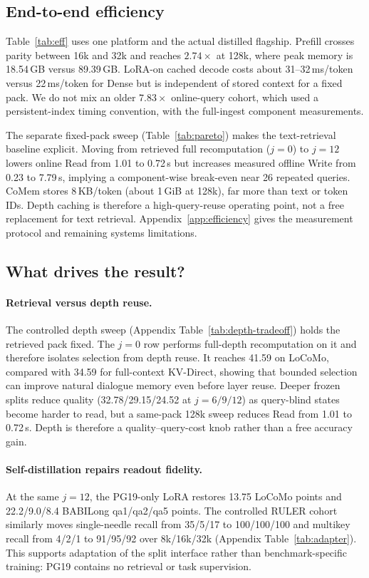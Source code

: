 \subsection{End-to-end efficiency}

Table~\ref{tab:eff} uses one platform and the actual distilled flagship. Prefill
crosses parity between 16k and 32k and reaches $2.74\times$ at 128k, where peak
memory is 18.54\,GB versus 89.39\,GB. LoRA-on cached decode costs about
31--32\,ms/token versus 22\,ms/token for Dense but is independent of stored
context for a fixed pack. We do not mix an older $7.83\times$ online-query
cohort, which used a persistent-index timing convention, with the full-ingest
component measurements.

The separate fixed-pack sweep (Table~\ref{tab:pareto}) makes the text-retrieval
baseline explicit. Moving from retrieved full recomputation ($j{=}0$) to
$j{=}12$ lowers online Read from 1.01 to 0.72\,s but increases measured offline
Write from 0.23 to 7.79\,s, implying a component-wise break-even near 26 repeated
queries. CoMem stores 8\,KB/token (about 1\,GiB at 128k), far more than text or
token IDs. Depth caching is therefore a high-query-reuse operating point, not a
free replacement for text retrieval. Appendix~\ref{app:efficiency} gives the
measurement protocol and remaining systems limitations.

\subsection{What drives the result?}
\paragraph{Retrieval versus depth reuse.}
The controlled depth sweep (Appendix Table~\ref{tab:depth-tradeoff}) holds the
retrieved pack fixed. The $j=0$ row performs full-depth recomputation on it and
therefore isolates selection from depth reuse. It reaches 41.59 on LoCoMo,
compared with 34.59 for full-context KV-Direct, showing that bounded selection
can improve natural dialogue memory even before layer reuse. Deeper frozen
splits reduce quality (32.78/29.15/24.52 at $j=6/9/12$) as query-blind states
become harder to read, but a same-pack 128k sweep reduces Read from 1.01 to
0.72\,s. Depth is therefore a quality--query-cost knob rather than a free
accuracy gain.

\paragraph{Self-distillation repairs readout fidelity.}
At the same $j=12$, the PG19-only LoRA restores 13.75 LoCoMo points and
22.2/9.0/8.4 BABILong qa1/qa2/qa5 points. The controlled RULER cohort similarly
moves single-needle recall from 35/5/17 to 100/100/100 and multikey recall from
4/2/1 to 91/95/92 over 8k/16k/32k (Appendix Table~\ref{tab:adapter}). This
supports adaptation of the split interface rather than benchmark-specific
training: PG19 contains no retrieval or task supervision.

